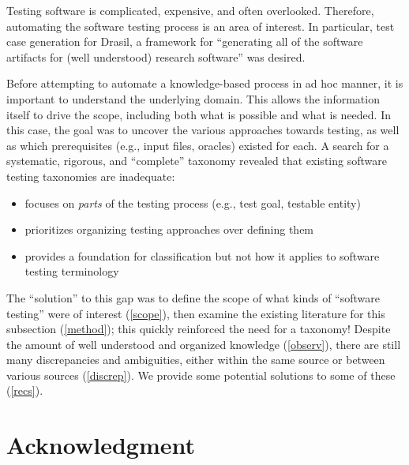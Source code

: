 \documentclass[conference]{IEEEtran}
\begin{document}

Testing software is complicated, expensive, and often overlooked. Therefore,
automating the software testing process is an area of interest. In particular,
test case generation for Drasil, a framework for ``generating all of the
software artifacts for (well understood) research software'' \cite{Drasil} was
desired.

Before attempting to automate a knowledge-based process in ad hoc manner, it is
important to understand the underlying domain. This allows the information
itself to drive the scope, including both what is possible and what is needed.
In this case, the goal was to uncover the various approaches towards testing,
as well as which prerequisites (e.g., input files, oracles) existed for each.
A search for a systematic, rigorous, and ``complete'' taxonomy revealed that
existing software testing taxonomies are inadequate:

\begin{itemize}
    \item \cite{TebesEtAl2020a} focuses on \emph{parts} of the
          testing process (e.g., test goal, testable entity)
    \item \cite{SouzaEtAl2017} prioritizes organizing testing
          approaches over defining them
    \item \cite{UnterkalmsteinerEtAl2014} provides a foundation for
          classification but not how it applies to software testing terminology
\end{itemize}

The ``solution'' to this gap was to define the scope of what kinds of
``software testing'' were of interest (\ref{scope}), then examine the existing
literature for this subsection (\ref{method}); this
quickly reinforced the need for a taxonomy! Despite the amount of
well understood and organized knowledge (\ref{observ}), there are still many
discrepancies and ambiguities, either within the same source or between various
sources (\ref{discrep}). We provide some potential solutions to some of these
(\ref{recs}).







\section*{Acknowledgment}


\newpage



\end{document}
